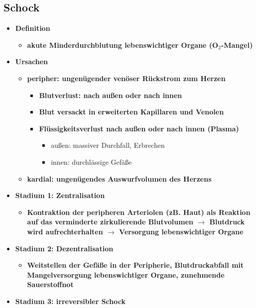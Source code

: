 	\subsection{Schock}
		\begin{itemize}
			\item \textbf{Definition}
				\begin{itemize}
					\item \textbf{akute Minderdurchblutung lebenswichtiger Organe (O$_2$-Mangel)}
				\end{itemize}
			\item \textbf{Ursachen}
				\begin{itemize}
					\item \textbf{peripher: ungenügender venöser Rückstrom zum Herzen}
						\begin{itemize}
							\item \textbf{Blutverlust: nach außen oder nach innen}
							\item \textbf{Blut versackt in erweiterten Kapillaren und Venolen}
							\item \textbf{Flüssigkeitsverlust nach außen oder nach innen (Plasma)} 
								\begin{itemize}
									\item außen: massiver Durchfall, Erbrechen
									\item innen: durchlässige Gefäße
								\end{itemize}
						\end{itemize}
					\item \textbf{kardial: ungenügendes Auswurfvolumen des Herzens}
				\end{itemize}
			\item \textbf{Stadium 1: Zentralisation}
				\begin{itemize}
					\item \textbf{Kontraktion der peripheren Arteriolen (zB. Haut) als Reaktion auf das verminderte zirkulierende Blutvolumen $\rightarrow$ Blutdruck wird aufrechterhalten $\rightarrow$ Versorgung lebenswichtiger Organe}
				\end{itemize}
			\item \textbf{Stadium 2: Dezentralisation}
				\begin{itemize}
					\item \textbf{Weitstellen der Gefäße in der Peripherie, Blutdruckabfall mit Mangelversorgung lebenswichtiger Organe, zunehmende Sauerstoffnot}
				\end{itemize}
			\item \textbf{Stadium 3: irreversibler Schock}

\end{itemize}
